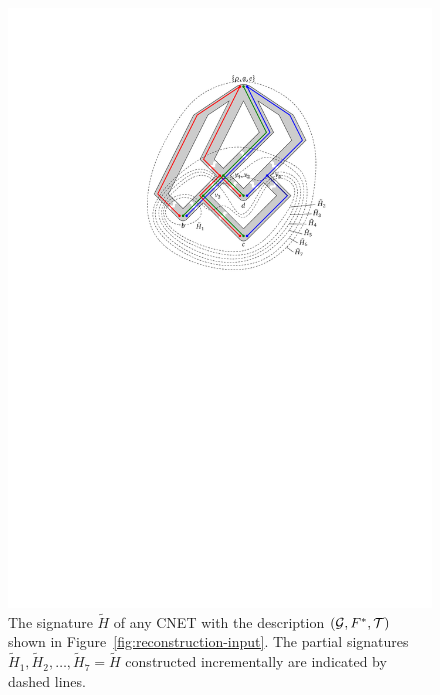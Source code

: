 \begin{figure}
  \centering
  \includegraphics{../figs/ch4/reconstruction-signature}
  \caption{The signature $\tilde H$ of any CNET with the description
    $(\mathcal{G}, F^*, \mathcal{T})$ shown in Figure~\ref{fig:reconstruction-input}.
    The {partial signatures} $\tilde H_1, \tilde H_2, \dots, \tilde H_7 = \tilde H$
    constructed incrementally are indicated by dashed lines.}
  \label{fig:reconstruction-signature}
\end{figure}

